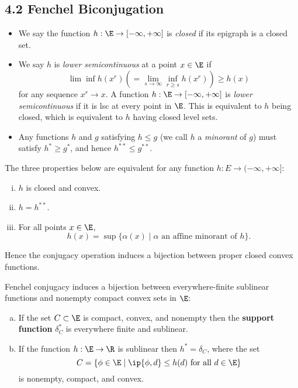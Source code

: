 \documentclass[../borwein-lewis_notes.tex]{subfiles}
\begin{document}
\maketitle
\subsection{4.2 Fenchel Biconjugation}
\begin{itemize}
\item We say the function $h:\E\to[-\infty,+\infty]$ is \textit{closed}
if its epigraph is a closed set. 
\item We say $h$ is \textit{lower semicontinuous} at a point $x\in\E$ 
if 
\begin{equation*}
\lim\inf h(x^r) \left(=\lim_{s\to\infty}\inf_{r\geq s}h(x^r)\right)
\geq h(x)
\end{equation*}
for any sequence $x^r \to x$. A function $h:\E\to[-\infty,+\infty]$ 
is \textit{lower semicontinuous} if it is lsc at every point in 
$\E$. This is equivalent to $h$ being closed, which is equivalent to 
$h$ having closed level sets.
\item Any functions $h$ and $g$ satisfying $h\leq g$ (we call $h$ 
a \textit{minorant} of $g$) must satisfy $h^*\geq g^*$, and 
hence $h^{**}\leq g^{**}$.
\end{itemize}
\begin{theorem}
The three properties below are equivalent for any function $h:E\to
(-\infty, +\infty]$: 
\label{4.2.1}
\begin{enumerate}[(i)]
\item $h$ is closed and convex.
\item $h=h^{**}$.
\item For all points $x\in\E$, 
\begin{equation*}
h(x) = \sup\{\alpha(x)\mid \alpha \text{ an affine minorant of } h\}.
\end{equation*}
\end{enumerate}
Hence the conjugacy operation induces a bijection between proper
closed convex functions.
\end{theorem}
\begin{corollary}
Fenchel conjugacy induces a bijection between everywhere-finite 
sublinear functions and nonempty compact convex sets in $\E$: 
\label{4.2.3}
\begin{enumerate}[(a)]
\item If the set $C\subset\E$ is compact, convex, and nonempty then 
the \textbf{support function} $\delta_C^*$ is everywhere finite and 
sublinear. 
\item If the function $h:\E\to\R$ is sublinear then $h^*=\delta_C$,
where the set 
\begin{equation*}
C = \{\phi\in\E\mid \ip{\phi, d}\leq h(d) \text{ for all }d\in \E\}
\end{equation*}
is nonempty, compact, and convex.
\end{enumerate}
\end{corollary}
\end{document}
